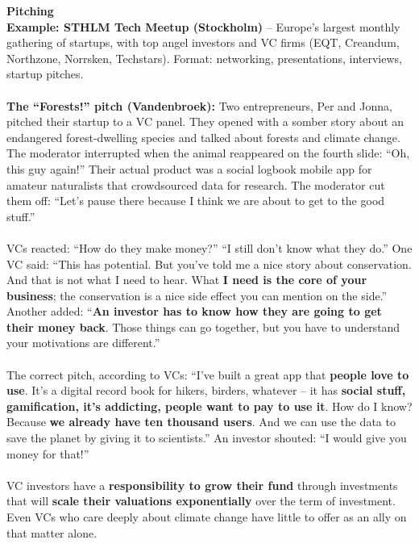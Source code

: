 \documentclass[a4paper,12pt]{article}
\begin{document}
\noindent \textbf{Pitching} \\
\noindent \textbf{Example: STHLM Tech Meetup (Stockholm)} -- Europe's largest monthly gathering of startups, with top angel investors and VC firms (EQT, Creandum, Northzone, Norrsken, Techstars). Format: networking, presentations, interviews, startup pitches. \\
\\
\noindent \textbf{The ``Forests!'' pitch (Vandenbroek):} Two entrepreneurs, Per and Jonna, pitched their startup to a VC panel. They opened with a somber story about an endangered forest-dwelling species and talked about forests and climate change. The moderator interrupted when the animal reappeared on the fourth slide: ``Oh, this guy again!'' Their actual product was a social logbook mobile app for amateur naturalists that crowdsourced data for research. The moderator cut them off: ``Let's pause there because I think we are about to get to the good stuff.'' \\
\\
\noindent VCs reacted: ``How do they make money?'' ``I still don't know what they do.'' One VC said: ``This has potential. But you've told me a nice story about conservation. And that is not what I need to hear. What \textbf{I need is the core of your business}; the conservation is a nice side effect you can mention on the side.'' Another added: ``\textbf{An investor has to know how they are going to get their money back}. Those things can go together, but you have to understand your motivations are different.'' \\
\\
\noindent The correct pitch, according to VCs: ``I've built a great app that \textbf{people love to use}. It's a digital record book for hikers, birders, whatever -- it has \textbf{social stuff, gamification, it's addicting, people want to pay to use it}. How do I know? Because \textbf{we already have ten thousand users}. And we can use the data to save the planet by giving it to scientists.'' An investor shouted: ``I would give you money for that!'' \\
\\
\noindent VC investors have a \textbf{responsibility to grow their fund} through investments that will \textbf{scale their valuations exponentially} over the term of investment. Even VCs who care deeply about climate change have little to offer as an ally on that matter alone. \\
\end{document}
